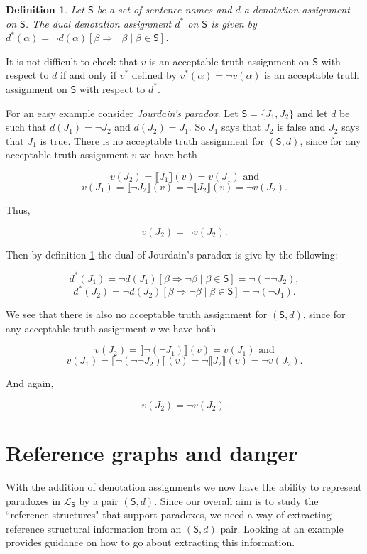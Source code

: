 \documentclass[12pt]{article}
\newtheorem{defn}{Definition}
\theoremstyle{remark}
\newcommand{\prg}{\hspace{0.25in}}
\newcommand{\fancy}[1]{\mathcal{#1}}
\def\S{\textsf{S}}
\def\L{\fancy{L}}
\begin{document}
\begin{defn}\label{dualdef}
Let $\S$ be a set of sentence names and $d$ a denotation assignment on $\S$.  The \emph{dual} denotation assignment $d^*$ on $\S$ is given by $d^*(\alpha) = \neg d(\alpha)[\beta \Rightarrow \neg \beta \mid \beta \in \S]$.
\end{defn}

It is not difficult to check that $v$ is an acceptable truth assignment on $\S$ with respect to $d$ if and only if $v^*$ defined by $v^*(\alpha) = \neg v(\alpha)$ is an acceptable truth assignment on $\S$ with respect to $d^*$.

\prg For an easy example consider \textit{Jourdain's paradox}. Let $\S = \{J_1, J_2\}$ and let $d$ be such that  $d(J_1) = \neg J_2$ and $d(J_2) = J_1$. So $J_1$ says that $J_2$ is false and $J_2$ says that $J_1$ is true. There is no acceptable truth assignment for $(\S, d)$, since for any acceptable truth assignment $v$ we have both

\[v(J_2) = \llbracket J_1 \rrbracket(v) = v(J_1) \text{   and}\]
\[v(J_1) = \llbracket \neg J_2 \rrbracket(v) = \neg \llbracket J_2 \rrbracket(v) = \neg v(J_2).\]

Thus,

\[v(J_2) = \neg v(J_2).\]

Then by definition \ref{dualdef} the dual of Jourdain's paradox is give by the following:

\[d^*(J_1) = \neg d(J_1)[\beta \Rightarrow \neg \beta \mid \beta \in \S] = \neg (\neg \neg J_2),\]
\[d^*(J_2) = \neg d(J_2)[\beta \Rightarrow \neg \beta \mid \beta \in \S] = \neg (\neg J_1).\]


We see that there is also no acceptable truth assignment for $(\S, d)$, since for any acceptable truth assignment $v$ we have both

\[v(J_2) = \llbracket \neg (\neg J_1) \rrbracket(v) = v(J_1) \text{   and}\]
\[v(J_1) = \llbracket \neg (\neg \neg J_2) \rrbracket(v) = \neg \llbracket J_2 \rrbracket(v) = \neg v(J_2).\]

And again,

\[v(J_2) = \neg v(J_2).\]

\section{Reference graphs and danger}\label{sec2}

With the addition of denotation assignments we now have the ability to represent paradoxes in $\L_\S$ by a pair $(\S, d)$. Since our overall aim is to study the ``reference structures" that support paradoxes, we need a way of extracting reference structural information from an $(\S, d)$ pair. Looking at an example provides guidance on how to go about extracting this information.
\end{document}
